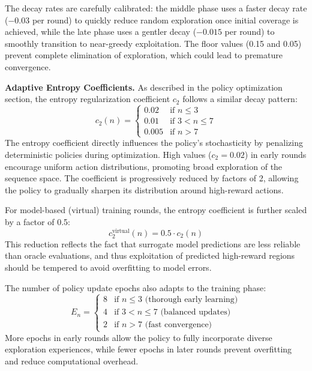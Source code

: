 The decay rates are carefully calibrated: the middle phase uses a faster decay rate ($-0.03$ per round) to quickly reduce random exploration once initial coverage is achieved, while the late phase uses a gentler decay ($-0.015$ per round) to smoothly transition to near-greedy exploitation. The floor values (0.15 and 0.05) prevent complete elimination of exploration, which could lead to premature convergence.

\textbf{Adaptive Entropy Coefficients.} As described in the policy optimization section, the entropy regularization coefficient $c_2$ follows a similar decay pattern:
%
\begin{equation}
c_2(n) = \begin{cases}
0.02 & \text{if } n \leq 3 \\
0.01 & \text{if } 3 < n \leq 7 \\
0.005 & \text{if } n > 7
\end{cases}
\end{equation}
%
The entropy coefficient directly influences the policy's stochasticity by penalizing deterministic policies during optimization. High values ($c_2 = 0.02$) in early rounds encourage uniform action distributions, promoting broad exploration of the sequence space. The coefficient is progressively reduced by factors of 2, allowing the policy to gradually sharpen its distribution around high-reward actions.

For model-based (virtual) training rounds, the entropy coefficient is further scaled by a factor of 0.5:
%
\begin{equation}
c_2^{\text{virtual}}(n) = 0.5 \cdot c_2(n)
\end{equation}
%
This reduction reflects the fact that surrogate model predictions are less reliable than oracle evaluations, and thus exploitation of predicted high-reward regions should be tempered to avoid overfitting to model errors.

The number of policy update epochs also adapts to the training phase:
%
\begin{equation}
E_n = \begin{cases}
8 & \text{if } n \leq 3 \text{ (thorough early learning)} \\
4 & \text{if } 3 < n \leq 7 \text{ (balanced updates)} \\
2 & \text{if } n > 7 \text{ (fast convergence)}
\end{cases}
\end{equation}
%
More epochs in early rounds allow the policy to fully incorporate diverse exploration experiences, while fewer epochs in later rounds prevent overfitting and reduce computational overhead.

